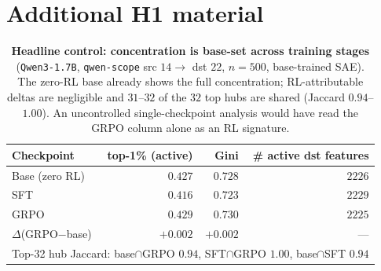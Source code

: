 \documentclass{article}
\begin{document}
\section{Additional H1 material}
\label{app:h1extra}

\begin{table}[h]
\centering
\caption{\textbf{Headline control: concentration is base-set across training stages} (\texttt{Qwen3-1.7B}, \texttt{qwen-scope} src $14\to$ dst $22$, $n{=}500$, base-trained SAE). The zero-RL base already shows the full concentration; RL-attributable deltas are negligible and $31$--$32$ of the $32$ top hubs are shared (Jaccard $0.94$--$1.00$). An uncontrolled single-checkpoint analysis would have read the GRPO column alone as an RL signature.}
\label{tab:h1_basecontrol}
\small
\begin{tabular}{lrrr}
\toprule
Checkpoint & top-1\% (active) & Gini & \# active dst features \\
\midrule
Base (zero RL) & $0.427$ & $0.728$ & $2226$ \\
SFT            & $0.416$ & $0.723$ & $2229$ \\
GRPO           & $0.429$ & $0.730$ & $2225$ \\
\midrule
$\Delta$(GRPO$-$base) & $+0.002$ & $+0.002$ & --- \\
\multicolumn{4}{l}{Top-32 hub Jaccard: base$\cap$GRPO $0.94$, \; SFT$\cap$GRPO $1.00$, \; base$\cap$SFT $0.94$} \\
\bottomrule
\end{tabular}
\end{table}
\end{document}
